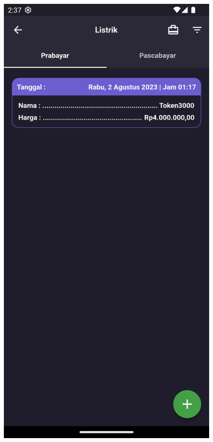 \begin{spacing}{1.5}
\begin{enumerate}
\begin{enumerate}
\begin{itemize}
				\begin{figure}[H]
						\includegraphics[width=\linewidth]{gambar/sprint4/el_1.png}

\end{figure}
\end{itemize}
\end{enumerate}
\end{enumerate}
\end{spacing}
